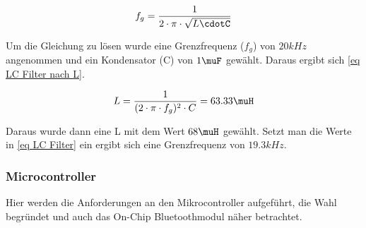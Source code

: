 \begin{equation}
f_g = \frac{1}{2\cdot \pi \cdot \sqrt{L\cdotC}}
\label{eq LC Filter}
\end{equation}

Um die Gleichung zu lösen wurde eine Grenzfrequenz ($f_g$) von $20kHz$ angenommen und ein Kondensator (C) von $1\muF$ gewählt. Daraus ergibt sich \autoref{eq LC Filter nach L}. 


\begin{equation}
L = \frac{1}{(2\cdot \pi \cdot f_g)^2\cdot C } = 63.33\muH
\label{eq LC Filter nach L}
\end{equation}

Daraus wurde dann eine L mit dem Wert $68\muH$ gewählt. Setzt man die Werte in \autoref{eq LC Filter} ein ergibt sich eine Grenzfrequenz von $19.3kHz$. 


\subsubsection{Microcontroller}
Hier werden die Anforderungen an den Mikrocontroller aufgeführt, die Wahl begründet und auch das On-Chip Bluetoothmodul näher betrachtet.
